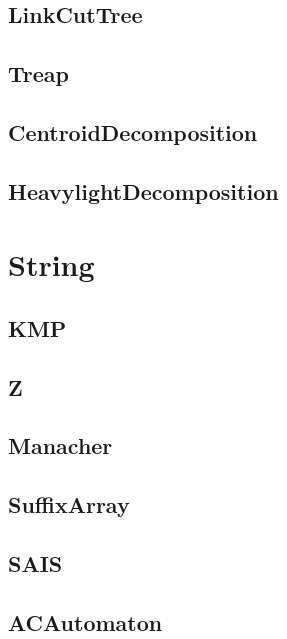 \subsection{LinkCutTree}

\subsection{Treap}

\subsection{CentroidDecomposition}

\subsection{HeavylightDecomposition}

\section{String}
\subsection{KMP}

\subsection{Z}

\subsection{Manacher}

\subsection{SuffixArray}

\subsection{SAIS}

\subsection{ACAutomaton}

